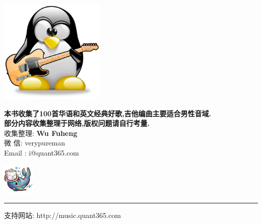 
\begin{center}
\vspace{10mm}
\includegraphics[width=50mm]{me}\\
\vspace{10mm}
\vspace*{3\baselineskip}

\textbf{本书收集了100首华语和英文经典好歌,吉他编曲主要适合男性音域.}\\
\textbf{部分内容收集整理于网络,版权问题请自行考量.}\\


收集整理: \textbf{Wu Fuheng} \\
微    信: verypureman \\
Email   : i@quant365.com


\vspace{5mm}
\includegraphics[width=15mm,height=15mm]{merlion}\\

\end{center}

\vfill
\noindent\rule{6cm}{0.4pt}

支持网站: http://music.quant365.com \\
\pagebreak
